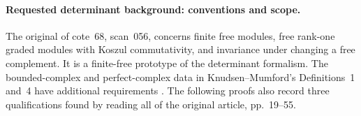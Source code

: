 \paragraph{Requested determinant background: conventions and scope.}
The original of cote~68, scan~056, concerns finite free modules,
free rank-one graded modules with Koszul commutativity, and invariance
under changing a free complement.  It is a finite-free prototype of the
determinant formalism.  The bounded-complex and perfect-complex data in
Knudsen--Mumford's Definitions~1 and~4 have additional requirements
\cite[pp.~20--24, 40--42]{ROOT_KnudsenMumford1976}.
The following proofs also record three qualifications found by reading
all of the original article, pp.~19--55.

